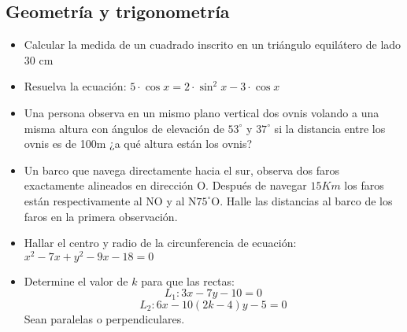 \documentclass[11pt, a5paper]{article}
\begin{document}
\subsection*{Geometría y trigonometría}
\begin{itemize}
\item{Calcular la medida de un cuadrado inscrito en un triángulo equilátero de lado 30 cm}
\item{Resuelva la ecuación: $5 \cdot \cos x = 2 \cdot \sin ^2 x - 3 \cdot \cos x$}
\item{Una persona observa en un mismo plano vertical dos ovnis volando a una misma altura con ángulos de elevación de $53^{\circ}$ y $37^{\circ}$ si la distancia entre los ovnis es de 100m ¿a qué altura están los ovnis?}
\item{Un barco que navega directamente hacia el sur, observa dos faros exactamente alineados en dirección O. Después de navegar $15 Km$ los faros están respectivamente al NO y al N$75^{\circ}$O. Halle las distancias al barco de los faros en la primera observación.}
\item{Hallar el centro y radio de la circunferencia de ecuación: $x^2 - 7x + y^2 - 9x - 18 = 0$}
\item{Determine el valor de $k$ para que las rectas:
$$
L_1 : 3x - 7y - 10 = 0 
$$
$$
L_2 : 6x - 10(2k -4)y - 5 = 0 
$$ Sean paralelas o perpendiculares.}
\end{itemize}
\end{document}
